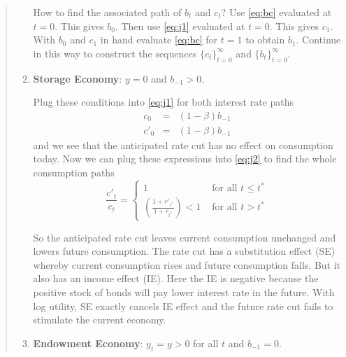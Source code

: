 \begin{exercise}
\begin{quote}
\begin{enumerate}
How to find the associated path of $b_t$ and $c_t$? Use \eqref{eq:bc} evaluated at $t=0$. This gives $b_0$. Then use \eqref{eq:j1} evaluated at $t=0$. This gives $c_1$. With $b_0$ and $c_1$ in hand evaluate \eqref{eq:bc} for $t=1$ to obtain $b_1$. Continue in this way to construct the sequences $\{c_t\}_{t=0}^{\infty}$ and $\{b_t\}_{t=0}^{\infty}$. 


\item 
{\bf Storage Economy}: $y=0$ and $b_{-1}>0$.

Plug these conditions into \eqref{eq:j1} for both interest rate paths
\begin{eqnarray*}
    c_0 &=& (1-\beta)b_{-1} \\
    c'_0 &=& (1-\beta)b_{-1}
\end{eqnarray*}
and we see that the anticipated rate cut has no effect on consumption today. Now we can plug these expressions into \eqref{eq:j2} to find the whole consumption paths
\[
\frac{c'_t}{c_t} = \left\{  \begin{array}{ll}
1 & \mbox{ for all } t\le t^*\\
\left(\frac{1+r'_{t^*}}{1+r_{t^*}} \right) <1 & \mbox{ for all } t> t^*
\end{array}
\right.
\]

So the anticipated rate cut leaves current consumption unchanged and lowers future consumption. The rate cut has a substitution effect (SE) whereby current consumption rises and future consumption falls. But it also has an income effect (IE). Here the IE is negative because the positive stock of bonds will pay lower interest rate in the future. With log utility, SE exactly cancels IE effect and the future rate cut fails to stimulate the current economy. 

\item 
{\bf Endowment Economy}: $y_t = y>0$ for all $t$ and $b_{-1}=0$. 


\end{enumerate}
\end{quote}
\end{exercise}
